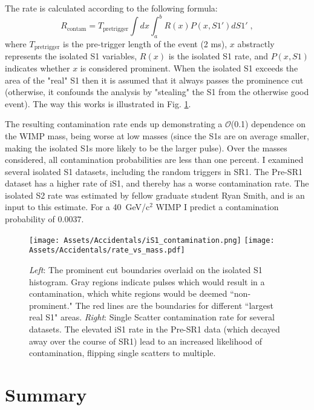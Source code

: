 The rate is calculated according to the following formula:
\begin{equation}
    R_{\text{contam}} = T_{\text{pretrigger}} \int dx \int_a^b R(x) P(x, S1')dS1'\;,
\end{equation}
\noindent
where $ T_{\text{pretrigger}} $ is the pre-trigger length of the event (2 ms), $x$ abstractly represents the isolated S1 variables, $R(x)$ is the isolated S1 rate, and $P(x, S1)$ indicates whether $x$ is considered prominent.
When the isolated S1 exceeds the area of the "real" S1 then it is assumed that it always passes the prominence cut (otherwise, it confounds the analysis by "stealing" the S1 from the otherwise good event).
The way this works is illustrated in Fig. \ref{fig:contamination_rate}.

The resulting contamination rate ends up demonstrating a $\mathcal{O}$(0.1) dependence on the WIMP mass, being worse at low masses (since the S1s are on average smaller, making the isolated S1s more likely to be the larger pulse).
Over the masses considered, all contamination probabilities are less than one percent.
I examined several isolated S1 datasets, including the random triggers in SR1.
The Pre-SR1 dataset has a higher rate of iS1, and thereby has a worse contamination rate.
The isolated S2 rate was estimated by fellow graduate student Ryan Smith, and is an input to this estimate.
For a  40~GeV/c$^2$ WIMP I predict a contamination probability of $0.0037$.

\begin{figure}
    \centering
     \texttt{[image: Assets/Accidentals/iS1\_contamination.png]}
    \texttt{[image: Assets/Accidentals/rate\_vs\_mass.pdf]}
    \caption[Accidentals single scatter contamination]%
    {\textit{Left}: The prominent cut boundaries overlaid on the isolated S1 histogram. Gray regions indicate pulses which would result in a contamination, which white regions would be deemed ``non-prominent." The red lines are the boundaries for different ``largest real S1" areas.
   \textit{Right}: Single Scatter contamination rate for several datasets. 
   The elevated iS1 rate in the Pre-SR1 data (which decayed away over the course of SR1) lead to an increased likelihood of contamination, flipping single scatters to multiple.}
    \label{fig:contamination_rate}
\end{figure}
\afterpage{\FloatBarrier}
\section{Summary}

